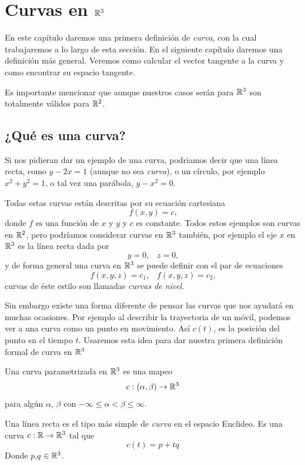 \chapter{Curvas en $\mathbb{R}^{3}$}\label{ch:curvas-en-r3}

En este capítulo daremos una primera definición de \emph{curva}, con la cual trabajaremos
a lo largo de esta sección. En el siguiente capítulo daremos una definición más general.
Veremos como calcular el vector tangente a la curva y como encontrar su espacio tangente.

Es importante mencionar que aunque nuestros casos serán para $\mathbb{R}^{3}$ son totalmente
válidos para $\mathbb{R}^{2}$.

\section{¿Qu\'e es una curva?}

Si nos pidieran dar un ejemplo de una curva, podriamos decir que una l\'inea recta, como
$y-2x=1$ (aunque no sea \emph{curva}), o un c\'irculo, por ejemplo $x^{2} + y^{2} = 1$, 
o tal vez una par\'abola, $y-x^{2}=0$.

Todas estas curvas est\'an descritas por su ecuaci\'on cartesiana
$$ f(x,y) = c \text{,} $$
donde $f$ es una funci\'on de $x$ y $y$ y $c$ es constante. Todos estos ejemplos son curvas
en $\mathbb{R}^{2}$, pero podr\'iamos considerar curvas en $\mathbb{R}^{3}$ tambi\'en, por ejemplo
el eje $x$ en $\mathbb{R}^{3}$ es la l\'inea recta dada por
$$y=0\text{,} \quad z=0 \text{,}$$
y de forma general una curva en $\mathbb{R}^{3}$ se puede definir con el par de ecuaciones
$$ f(x,y,z)=c_{1}\text{,}\quad f(x,y,z)=c_{2} \text{,}$$
curvas de \'este estilo son llamadas \emph{curvas de nivel}.

Sin embargo existe una forma diferente de pensar las curvas que nos ayudar\'a en muchas ocasiones. Por ejemplo al describir la trayectoria de un m\'ovil, podemos ver a una curva como un punto en movimiento. As\'i
$c(t)$, es la posici\'on del punto en el tiempo $t$. Usaremos esta idea para dar nuestra
primera definici\'on formal de curva en $\mathbb{R}^{3}$

\begin{definition}
    Una curva parametrizada en $\mathbb{R}^{3}$ es una mapeo 
    $$c:(\alpha,\beta) \rightarrow \mathbb{R}^{3}$$
    para alg\'un $\alpha$, $\beta$ con $-\infty \le \alpha < \beta \le \infty$.
\end{definition}

\begin{example}
    Una línea recta es el tipo más simple de \emph{curva} en el espacio Euclideo. Es una curva
    $c:\mathbb{R} \rightarrow \mathbb{R}^{3}$ tal que
    $$ c(t) = p + tq$$
    Donde $p$,$q$ $\in \mathbb{R}^{3}$.
\end{example}

